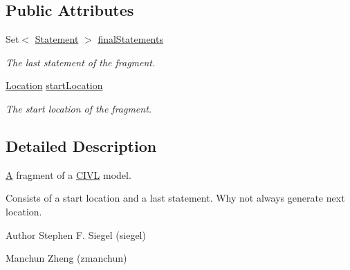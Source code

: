 \subsection*{Public Attributes}
\begin{DoxyCompactItemize}
\item 
\hypertarget{classedu_1_1udel_1_1cis_1_1vsl_1_1civl_1_1model_1_1common_1_1CommonFragment_ad541b85720e7883e241024ce054382d1}{}Set$<$ \hyperlink{interfaceedu_1_1udel_1_1cis_1_1vsl_1_1civl_1_1model_1_1IF_1_1statement_1_1Statement}{Statement} $>$ \hyperlink{classedu_1_1udel_1_1cis_1_1vsl_1_1civl_1_1model_1_1common_1_1CommonFragment_ad541b85720e7883e241024ce054382d1}{final\+Statements}\label{classedu_1_1udel_1_1cis_1_1vsl_1_1civl_1_1model_1_1common_1_1CommonFragment_ad541b85720e7883e241024ce054382d1}

\begin{DoxyCompactList}\small\item\em The last statement of the fragment. \end{DoxyCompactList}\item 
\hypertarget{classedu_1_1udel_1_1cis_1_1vsl_1_1civl_1_1model_1_1common_1_1CommonFragment_ad1d03c97ac98a41837fdacd82c3232f5}{}\hyperlink{interfaceedu_1_1udel_1_1cis_1_1vsl_1_1civl_1_1model_1_1IF_1_1location_1_1Location}{Location} \hyperlink{classedu_1_1udel_1_1cis_1_1vsl_1_1civl_1_1model_1_1common_1_1CommonFragment_ad1d03c97ac98a41837fdacd82c3232f5}{start\+Location}\label{classedu_1_1udel_1_1cis_1_1vsl_1_1civl_1_1model_1_1common_1_1CommonFragment_ad1d03c97ac98a41837fdacd82c3232f5}

\begin{DoxyCompactList}\small\item\em The start location of the fragment. \end{DoxyCompactList}\end{DoxyCompactItemize}


\subsection{Detailed Description}
\hyperlink{structA}{A} fragment of a \hyperlink{classedu_1_1udel_1_1cis_1_1vsl_1_1civl_1_1CIVL}{C\+I\+V\+L} model. 

Consists of a start location and a last statement. Why not always generate next location.

\begin{DoxyAuthor}{Author}
Stephen F. Siegel (siegel) 

Manchun Zheng (zmanchun) 
\end{DoxyAuthor}


